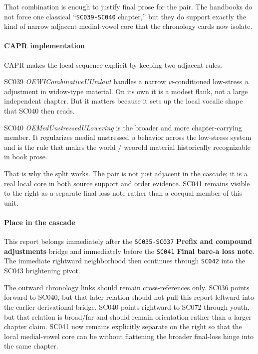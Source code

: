 \documentclass[
  british,
  a4paper,
]{article}
\begin{document}
That combination is enough to justify final prose for the pair. The
handbooks do not force one classical ``\texttt{SC039-SC040} chapter,''
but they do support exactly the kind of narrow adjacent medial-vowel
core that the chronology cards now isolate.

\paragraph{CAPR implementation}\label{capr-implementation-24}

CAPR makes the local sequence explicit by keeping two adjacent rules.

SC039 \emph{OEWICombinativeUUmlaut} handles a narrow
\emph{w}-conditioned low-stress \emph{u} adjustment in widow-type
material. On its own it is a modest flank, not a large independent
chapter. But it matters because it sets up the local vocalic shape that
SC040 then reads.

SC040 \emph{OEMedUnstressedULowering} is the broader and more
chapter-carrying member. It regularizes medial unstressed \emph{u}
behavior across the low-stress system and is the rule that makes the
world / weorold material historically recognizable in book prose.

That is why the split works. The pair is not just adjacent in the
cascade; it is a real local core in both source support and order
evidence. SC041 remains visible to the right as a separate final-loss
note rather than a coequal member of this unit.

\paragraph{Place in the cascade}\label{place-in-the-cascade-24}

This report belongs immediately after the \texttt{SC035-SC037}
\textbf{Prefix and compound adjustments} bridge and immediately before
the \texttt{SC041} \textbf{Final bare-a loss note}. The immediate
rightward neighborhood then continues through \texttt{SC042} into the
SC043 brightening pivot.

The outward chronology links should remain cross-references only. SC036
points forward to SC040, but that later relation should not pull this
report leftward into the earlier derivational bridge. SC040 points
rightward to SC072 through youth, but that relation is broad/far and
should remain orientation rather than a larger chapter claim. SC041 now
remains explicitly separate on the right so that the local medial-vowel
core can be without flattening the broader final-loss hinge into the
same chapter.
\end{document}
